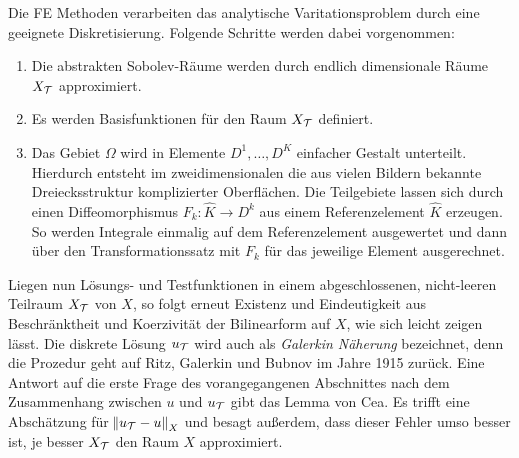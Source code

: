  Die FE Methoden verarbeiten das analytische Varitationsproblem durch eine geeignete Diskretisierung. Folgende Schritte werden dabei vorgenommen:
\begin{enumerate}[label=(\roman*)]
  \item Die abstrakten Sobolev-Räume werden durch endlich dimensionale Räume $X_{\mathcal{T}}$ approximiert.
  \item Es werden Basisfunktionen für den Raum $X_{\mathcal{T}}$ definiert.
  \item Das Gebiet $\Omega$ wird in Elemente $D^1,\dots, D^K$ einfacher Gestalt unterteilt. Hierdurch entsteht im zweidimensionalen die aus vielen Bildern bekannte Dreiecksstruktur komplizierter Oberflächen. Die Teilgebiete lassen sich durch einen Diffeomorphismus $F_k: \hat{K}\rightarrow D^k$ aus einem Referenzelement $\hat{K}$ erzeugen. So werden Integrale einmalig auf dem Referenzelement ausgewertet und dann über den Transformationssatz mit $F_k$ für das jeweilige Element ausgerechnet.
\end{enumerate}
Liegen nun Lösungs- und Testfunktionen in einem abgeschlossenen, nicht-leeren Teilraum $X_{\mathcal{T}}$ von $X$, so folgt erneut Existenz und Eindeutigkeit aus Beschränktheit und Koerzivität der Bilinearform auf $X$, wie sich leicht zeigen lässt. %
Die diskrete Lösung $u_{\mathcal{T}}$ wird auch als \emph{Galerkin Näherung} bezeichnet, denn die Prozedur geht auf Ritz, Galerkin und Bubnov im Jahre 1915 zurück. Eine Antwort auf die erste Frage des vorangegangenen Abschnittes nach dem Zusammenhang zwischen $u$ und $u_{\mathcal{T}}$ gibt das Lemma von Cea. Es trifft eine Abschätzung für $\norm{u_{\mathcal{T}}-u}_X$ und besagt außerdem, dass dieser Fehler umso besser ist, je besser $X_{\mathcal{T}}$ den Raum $X$ approximiert.

